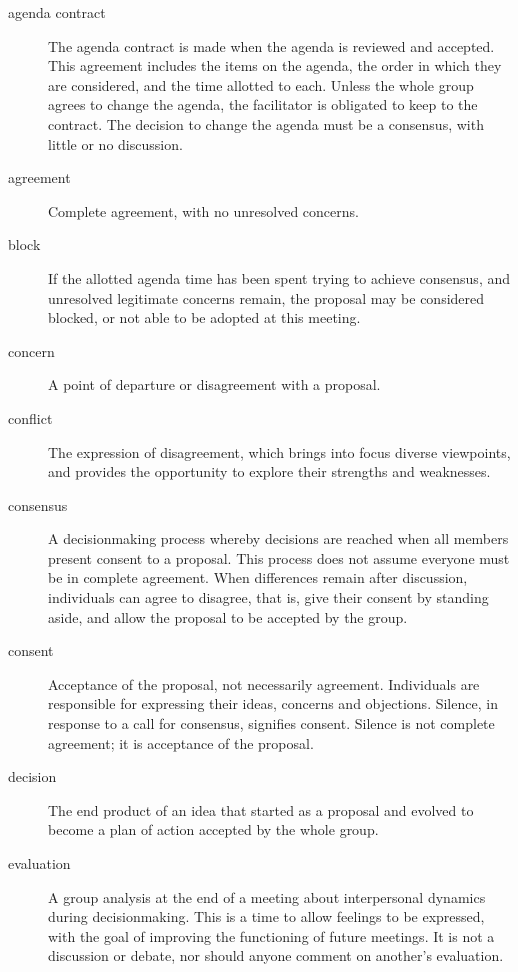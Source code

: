 \begin{description}
\item [agenda contract] The agenda contract is made when the agenda is reviewed and accepted. This agreement includes the items on the agenda, the order in which they are considered, and the time allotted to each.  Unless the whole group agrees to change the agenda, the facilitator is obligated to keep to the contract.  The decision to change the agenda must be a consensus, with little or no discussion.
\item [agreement] Complete agreement, with no unresolved concerns.
\item [block] If the allotted agenda time has been spent trying to achieve consensus, and unresolved legitimate concerns remain, the proposal may be considered blocked, or not able to be adopted at this meeting.
\item [concern]
A point of departure or disagreement with a proposal.
\item [conflict]
The expression of disagreement, which brings into focus diverse viewpoints, and provides the opportunity to explore their strengths and weaknesses.
\item [consensus]
A decisionmaking process whereby decisions are reached when all members present consent to a proposal. This process does not assume everyone must be in complete agreement. When differences remain after discussion, individuals can agree to disagree, that is, give their consent by standing aside, and allow the proposal to be accepted by the group.
\item [consent]
Acceptance of the proposal, not necessarily agreement. Individuals are responsible for expressing their ideas, concerns and objections. Silence, in response to a call for consensus, signifies consent. Silence is not complete agreement; it is acceptance of the proposal.
\item [decision]
The end product of an idea that started as a proposal and evolved to become a plan of action accepted by the whole group.
\item [evaluation]
A group analysis at the end of a meeting about interpersonal dynamics during decisionmaking.  This is a time to allow feelings to be expressed, with the goal of improving the functioning of future meetings. It is not a discussion or debate, nor should anyone comment on another's evaluation.

\end{description}
